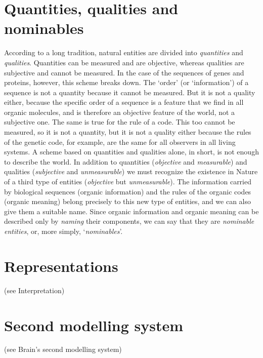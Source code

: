 \documentclass[12pt]{article}
\begin{document}
\section{Quantities, qualities and nominables}
According to a long tradition, natural entities are divided into \textit{quantities} and \textit{qualities}. Quantities can be measured and are objective, whereas qualities are subjective and cannot be measured. In the case of the sequences of genes and proteins, however, this scheme breaks down. The `order' (or `information') of a sequence is not a quantity because it cannot be measured. But it is not a quality either, because the specific order of a sequence is a feature that we find in all organic molecules, and is therefore an objective feature of the world, not a subjective one. The same is true for the rule of a code. This too cannot be measured, so it is not a quantity, but it is not a quality either because the rules of the genetic code, for example, are the same for all observers in all living systems. A scheme based on quantities and qualities alone, in short, is not enough to describe the world. In addition to quantities (\textit{objective} and \textit{measurable}) and qualities (\textit{subjective} and \textit{unmeasurable}) we must recognize the existence in Nature of a third type of entities (\textit{objective} but \textit{unmeasurable}). The information carried by biological sequences (organic information) and the rules of the organic codes (organic meaning) belong precisely to this new type of entities, and we can also give them a suitable name. Since organic information and organic meaning can be described only by \textit{naming} their components, we can say that they are \textit{nominable entities}, or, more simply, `\textit{nominables}'.


\section{Representations} (see Interpretation)


\section{Second modelling system} (see Brain's second modelling system)
\end{document}
